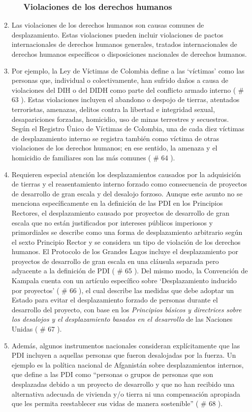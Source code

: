 \documentclass[
]{book}
\begin{document}
\begin{enumerate}
\begin{enumerate}
{    \subsubsection{Violaciones de los derechos humanos}\label{violaciones-de-los-derechos-humanos}}
  \end{enumerate}
\item
  Las violaciones de los derechos humanos son causas comunes de desplazamiento. Estas violaciones pueden incluir violaciones de pactos internacionales de derechos humanos generales, tratados internacionales de derechos humanos específicos o disposiciones nacionales de derechos humanos.
\item
  Por ejemplo, la Ley de Víctimas de Colombia define a las `víctimas' como las personas que, individual o colectivamente, han sufrido daños a causa de violaciones del DIH o del DIDH como parte del conflicto armado interno (
  \# 63
  ). Estas violaciones incluyen el abandono o despojo de tierras, atentados terroristas, amenazas, delitos contra la libertad e integridad sexual, desapariciones forzadas, homicidio, uso de minas terrestres y secuestros. Según el Registro Único de Víctimas de Colombia, una de cada diez víctimas de desplazamiento interno se registra también como víctima de otras violaciones de los derechos humanos; en ese sentido, la amenaza y el homicidio de familiares son las más comunes (
  \# 64
  ).
\item
  Requieren especial atención los desplazamientos causados por la adquisición de tierras y el reasentamiento interno forzado como consecuencia de proyectos de desarrollo de gran escala y del desalojo forzoso. Aunque este asunto no se menciona específicamente en la definición de las PDI en los Principios Rectores, el desplazamiento causado por proyectos de desarrollo de gran escala que no están justificados por intereses públicos imperiosos y primordiales se describe como una forma de desplazamiento arbitrario según el sexto Principio Rector y se considera un tipo de violación de los derechos humanos. El Protocolo de los Grandes Lagos incluye el desplazamiento por proyectos de desarrollo de gran escala en una cláusula separada pero adyacente a la definición de PDI (
  \# 65
  ). Del mismo modo, la Convención de Kampala cuenta con un artículo específico sobre `Desplazamiento inducido por proyectos' (
  \# 66
  ), el cual describe las medidas que debe adoptar un Estado para evitar el desplazamiento forzado de personas durante el desarrollo del proyecto, con base en los \emph{Principios básicos y directrices sobre los desalojos y el desplazamiento basados en el desarrollo} de las Naciones Unidas (
  \# 67
  ).
\item
  Además, algunos instrumentos nacionales consideran explícitamente que las PDI incluyen a aquellas personas que fueron desalojadas por la fuerza. Un ejemplo es la política nacional de Afganistán sobre desplazamientos internos, que define a las PDI como ``personas o grupos de personas que son desplazadas debido a un proyecto de desarrollo y que no han recibido una alternativa adecuada de vivienda y/o tierra ni una compensación apropiada que les permita reestablecer sus vidas de manera sostenible'' (
  \# 68
  ).


\end{enumerate}
\end{document}
